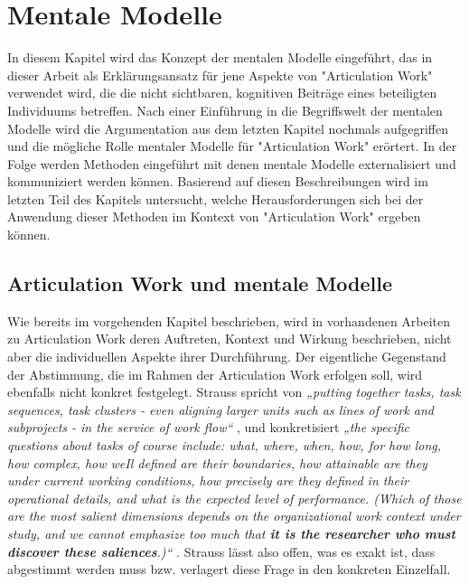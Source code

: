 \chapter{Mentale Modelle} %
\label{cha:mentale_modelle}

In diesem Kapitel wird das Konzept der mentalen Modelle eingeführt, das in dieser Arbeit als Erklärungsansatz für jene Aspekte von "Articulation Work" verwendet wird, die die nicht sichtbaren, kognitiven Beiträge eines beteiligten Individuums betreffen. Nach einer Einführung in die Begriffswelt der mentalen Modelle wird die Argumentation aus dem letzten Kapitel nochmals aufgegriffen und die mögliche Rolle mentaler Modelle für "Articulation Work" erörtert. In der Folge werden Methoden eingeführt mit denen mentale Modelle externalisiert und kommuniziert werden können. Basierend auf diesen Beschreibungen wird im letzten Teil des Kapitels untersucht, welche Herausforderungen sich bei der Anwendung dieser Methoden im Kontext von "Articulation Work" ergeben können.

\section{Articulation Work und mentale Modelle} %
\label{sec:articulation_work_und_mentale_modelle}

Wie bereits im vorgehenden Kapitel beschrieben, wird in vorhandenen Arbeiten zu Articulation Work deren Auftreten, Kontext und Wirkung beschrieben, nicht aber die individuellen Aspekte ihrer Durchführung. Der eigentliche Gegenstand der Abstimmung, die im Rahmen der Articulation Work erfolgen soll, wird ebenfalls nicht konkret festgelegt. Strauss spricht von \emph{„putting together tasks, task sequences, task clusters - even aligning larger units such as lines of work and subprojects - in the service of work flow“} \citep[][S. 2]{Strauss88}, und konkretisiert \emph{„the specific questions about tasks of course include: what, where, when, how, for how long, how complex, how weIl defined are their boundaries, how attainable are they under current working conditions, how precisely are they defined in their operational details, and what is the expected level of performance. (Which of those are the most salient dimensions depends on the organizational work context under study, and we cannot emphasize too much that \textbf{it is the researcher who must discover these saliences}.)“} \citep[][S. 6]{Strauss85}. Strauss lässt also offen, was es exakt ist, dass abgestimmt werden muss bzw. verlagert diese Frage in den konkreten Einzelfall. 

